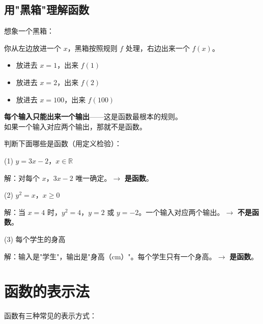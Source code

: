 \subsection{用"黑箱"理解函数}

想象一个黑箱：

\begin{center}
\end{center}

你从左边放进一个 \(x\)，黑箱按照规则 \(f\) 处理，右边出来一个 \(f(x)\)。

\begin{itemize}
  \item 放进去 \(x=1\)，出来 \(f(1)\)
  \item 放进去 \(x=2\)，出来 \(f(2)\)
  \item 放进去 \(x=100\)，出来 \(f(100)\)
\end{itemize}

\textbf{每个输入只能出来一个输出}——这是函数最根本的规则。\\
如果一个输入对应两个输出，那就不是函数。

\begin{examplebox}[4]
判断下面哪些是函数（用定义检验）：

(1) \(y = 3x - 2\)，\(x \in \mathbb{R}\)

解：对每个 \(x\)，\(3x - 2\) 唯一确定。\(\rightarrow\) \textbf{是函数}。

(2) \(y^2 = x\)，\(x \ge 0\)

解：当 \(x = 4\) 时，\(y^2 = 4\)，\(y = 2\) 或 \(y = -2\)。一个输入对应两个输出。\(\rightarrow\) \textbf{不是函数}。

(3) 每个学生的身高

解：输入是"学生"，输出是"身高（cm）"。每个学生只有一个身高。\(\rightarrow\) \textbf{是函数}。
\end{examplebox}


\section{函数的表示法}

函数有三种常见的表示方式：


